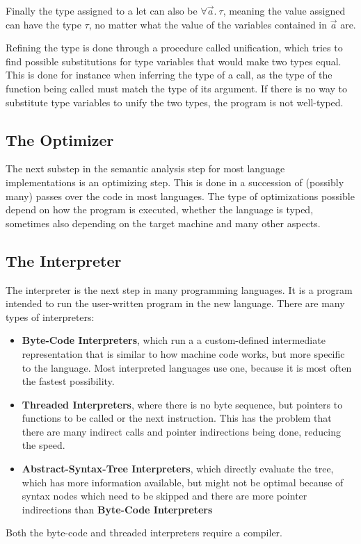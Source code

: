\documentclass[12pt]{article}
\begin{document}
Finally the type assigned to a let can also be
$\forall \vec{a}.\:\tau$, meaning the value assigned
can have the type $\tau$, no matter what the value of the variables contained in $\vec{a}$ are.

Refining the type is done through a procedure called unification,
which tries to find possible substitutions for type variables that would make two
types equal. This is done for instance when inferring the type of a call,
as the type of the function being called must match
the type of its argument.
If there is no way to substitute type variables
to unify the two types, the program is not well-typed.

\subsection{The Optimizer}
The next substep in the semantic analysis step for most language implementations is an optimizing step.
This is done in a succession of (possibly many) passes over the code in most languages. The type of optimizations
possible depend on how the program is executed, whether the language is typed,
sometimes also depending on the target machine and many other aspects.

\subsection{The Interpreter}
The interpreter is the next step in many programming languages.
It is a program intended to run the user-written program in the new
language. There are many types of interpreters:
\begin{itemize}
	\item \textbf{Byte-Code Interpreters}, which run a
	      a custom-defined intermediate representation that is similar to how
	      machine code works, but more specific to the language. Most interpreted languages
	      use one, because it is most often the fastest possibility.
	\item \textbf{Threaded Interpreters}, where there is no byte sequence, but pointers
	      to functions to be called or the next instruction. This has the problem that there
	      are many indirect calls and pointer indirections being done, reducing the speed.
	\item \textbf{Abstract-Syntax-Tree Interpreters}, which directly evaluate the tree,
	      which has more information available, but might not be optimal because of syntax
	      nodes which need to be skipped and there are more pointer indirections than
	      \textbf{Byte-Code Interpreters}
\end{itemize}
Both the byte-code and threaded interpreters require a compiler.
\end{document}
